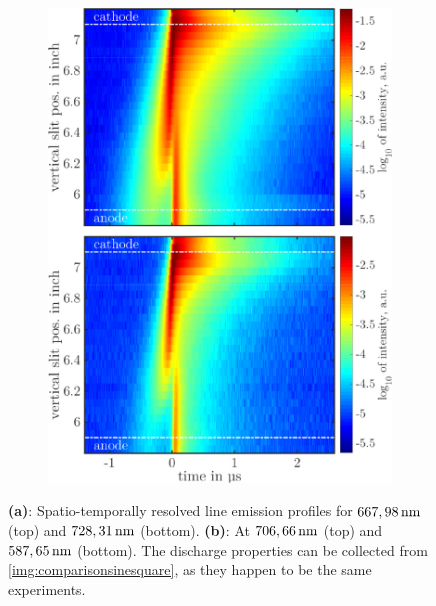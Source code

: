 \documentclass[a4paper,10pt,twoside]{article}
\newcommand{\fett}[1]{\textbf{#1}}
\begin{document}
\begin{figure}
\begin{subfigure}[t]{0.49\textwidth}
					\includegraphics[width=\textwidth]{figures/lineratio/combinations/korr706over587.pdf}
					\caption{}
					\label{img:706u587nm}
				\end{subfigure}
				\vspace{0.3cm}
				\caption{\fett{(a)}: Spatio-temporally resolved line emission profiles for $\unit[667,98]{nm}$ (top) and $\unit[728,31]{nm}$ (bottom). \fett{(b)}: At $\unit[706,66]{nm}$ (top) and $\unit[587,65]{nm}$ (bottom). The discharge properties can be collected from \autoref{img:comparisonsinesquare}, as they happen to be the same experiments.}
				\label{img:comparisonemissionline}
			\end{figure}
			
		\begin{multicols*}{2}
			
		\end{multicols*}
			
			\twocolumn
		
\end{document}
